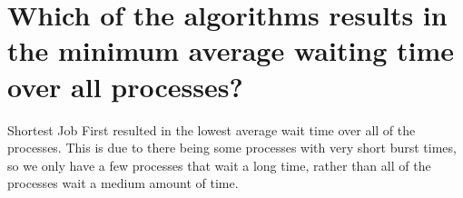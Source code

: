 \documentclass{article}
\begin{document}
\section{Which of the algorithms results in the minimum average waiting time over all processes?}

Shortest Job First resulted in the lowest average wait time over all of the processes. This is due to there being some processes with very short burst times, so we only have a few processes that wait a long time, rather than all of the processes wait a medium amount of time. 
\end{document}

